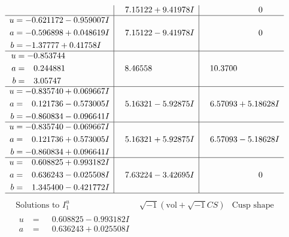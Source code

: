 \documentclass[1p]{elsarticle_modified}
\theoremstyle{definition}
\newcommand{\I}{\sqrt{-1}}
\begin{document}
$$\begin{array}{c|c|c}
 & \phantom{-}7.15122 + 9.41978 I & \phantom{-0.000000 } 0 \\ \hline\begin{aligned}
u &= -0.621172 - 0.959007 I \\
a &= -0.596898 + 0.048619 I \\
b &= -1.37777 + 0.41758 I\end{aligned}
 & \phantom{-}7.15122 - 9.41978 I & \phantom{-0.000000 } 0 \\ \hline\begin{aligned}
u &= -0.853744\phantom{ +0.000000I} \\
a &= \phantom{-}0.244881\phantom{ +0.000000I} \\
b &= \phantom{-}3.05747\phantom{ +0.000000I}\end{aligned}
 & \phantom{-}8.46558\phantom{ +0.000000I} & \phantom{-}10.3700\phantom{ +0.000000I} \\ \hline\begin{aligned}
u &= -0.835740 + 0.069667 I \\
a &= \phantom{-}0.121736 - 0.573005 I \\
b &= -0.860834 - 0.096641 I\end{aligned}
 & \phantom{-}5.16321 - 5.92875 I & \phantom{-}6.57093 + 5.18628 I \\ \hline\begin{aligned}
u &= -0.835740 - 0.069667 I \\
a &= \phantom{-}0.121736 + 0.573005 I \\
b &= -0.860834 + 0.096641 I\end{aligned}
 & \phantom{-}5.16321 + 5.92875 I & \phantom{-}6.57093 - 5.18628 I \\ \hline\begin{aligned}
u &= \phantom{-}0.608825 + 0.993182 I \\
a &= \phantom{-}0.636243 - 0.025508 I \\
b &= \phantom{-}1.345400 - 0.421772 I\end{aligned}
 & \phantom{-}7.63224 - 3.42695 I & \phantom{-0.000000 } 0\\
 \hline 
 \end{array}$$\newpage$$\begin{array}{c|c|c}  
\text{Solutions to }I^u_{1}& \I (\text{vol} + \sqrt{-1}CS) & \text{Cusp shape}\\
 \hline 
\begin{aligned}
u &= \phantom{-}0.608825 - 0.993182 I \\
a &= \phantom{-}0.636243 + 0.025508 I \\

\end{aligned}
\end{array}$$
\end{document}
